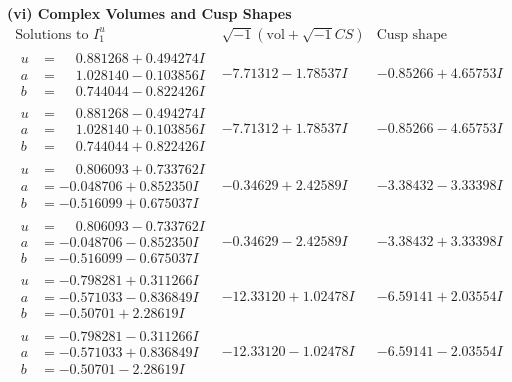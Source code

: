 \documentclass[1p]{elsarticle_modified}
\theoremstyle{definition}
\newcommand{\I}{\sqrt{-1}}
\begin{document}
\newpage\flushleft \textbf{(vi) Complex Volumes and Cusp Shapes}
$$\begin{array}{c|c|c}  
\text{Solutions to }I^u_{1}& \I (\text{vol} + \sqrt{-1}CS) & \text{Cusp shape}\\
 \hline 
\begin{aligned}
u &= \phantom{-}0.881268 + 0.494274 I \\
a &= \phantom{-}1.028140 - 0.103856 I \\
b &= \phantom{-}0.744044 - 0.822426 I\end{aligned}
 & -7.71312 - 1.78537 I & -0.85266 + 4.65753 I \\ \hline\begin{aligned}
u &= \phantom{-}0.881268 - 0.494274 I \\
a &= \phantom{-}1.028140 + 0.103856 I \\
b &= \phantom{-}0.744044 + 0.822426 I\end{aligned}
 & -7.71312 + 1.78537 I & -0.85266 - 4.65753 I \\ \hline\begin{aligned}
u &= \phantom{-}0.806093 + 0.733762 I \\
a &= -0.048706 + 0.852350 I \\
b &= -0.516099 + 0.675037 I\end{aligned}
 & -0.34629 + 2.42589 I & -3.38432 - 3.33398 I \\ \hline\begin{aligned}
u &= \phantom{-}0.806093 - 0.733762 I \\
a &= -0.048706 - 0.852350 I \\
b &= -0.516099 - 0.675037 I\end{aligned}
 & -0.34629 - 2.42589 I & -3.38432 + 3.33398 I \\ \hline\begin{aligned}
u &= -0.798281 + 0.311266 I \\
a &= -0.571033 - 0.836849 I \\
b &= -0.50701 + 2.28619 I\end{aligned}
 & -12.33120 + 1.02478 I & -6.59141 + 2.03554 I \\ \hline\begin{aligned}
u &= -0.798281 - 0.311266 I \\
a &= -0.571033 + 0.836849 I \\
b &= -0.50701 - 2.28619 I\end{aligned}
 & -12.33120 - 1.02478 I & -6.59141 - 2.03554 I \\ \hline\begin{aligned}

\end{aligned}
\end{array}$$
\end{document}
